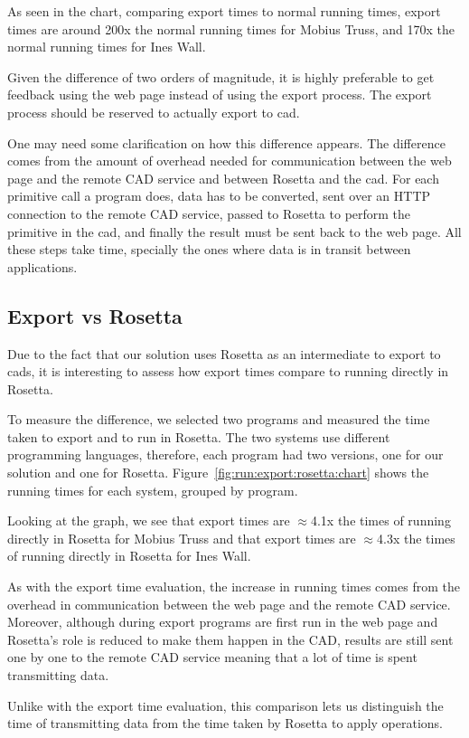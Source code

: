 As seen in the chart, comparing export times to normal running times, export times are around 200x the normal running times for Mobius Truss, and 170x the normal running times for Ines Wall.

Given the difference of two orders of magnitude, it is highly preferable to get feedback using the web page instead of using the export process.
The export process should be reserved to actually export to \gls{cad}.

One may need some clarification on how this difference appears.
The difference comes from the amount of overhead needed for communication between the web page and the remote CAD service and between Rosetta and the \gls{cad}.
For each primitive call a program does, data has to be converted, sent over an HTTP connection to the remote CAD service, passed to Rosetta to perform the primitive in the \gls{cad}, and finally the result must be sent back to the web page.
All these steps take time, specially the ones where data is in transit between applications.


\subsection{Export vs Rosetta}
Due to the fact that our solution uses Rosetta as an intermediate to export to \glspl{cad}, it is interesting to assess how export times compare to running directly in Rosetta.

To measure the difference, we selected two programs and measured the time taken to export and to run in Rosetta.
The two systems use different programming languages, therefore, each program had two versions, one for our solution and one for Rosetta.
Figure~\ref{fig:run:export:rosetta:chart} shows the running times for each system, grouped by program.

Looking at the graph, we see that export times are $\approx$4.1x the times of running directly in Rosetta for Mobius Truss and that export times are $\approx$4.3x the times of running directly in Rosetta for Ines Wall.

As with the export time evaluation, the increase in running times comes from the overhead in communication between the web page and the remote CAD service.
Moreover, although during export programs are first run in the web page and Rosetta's role is reduced to make them happen in the CAD, results are still sent one by one to the remote CAD service meaning that a lot of time is spent transmitting data.

Unlike with the export time evaluation, this comparison lets us distinguish the time of transmitting data from the time taken by Rosetta to apply operations.


